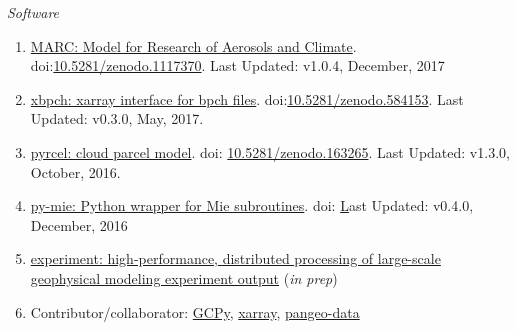 \documentclass[11pt,letterpaper]{article}
\newcommand{\mhead}[1]{\leavevmode\marginpar{\sffamily\footnotesize #1}}
\begin{document}
\bigskip
\emph{Software}
\medskip
\begin{enumerate}[itemindent=-10pt]

\item \href{https://github.mit.edu/marc/marc_cesm}{MARC: Model for Research of Aerosols and Climate}. doi:\href{https://doi.org/10.5281/zenodo.1117370}{10.5281/zenodo.1117370}. Last Updated: v1.0.4, December, 2017

\item \href{https://github.com/darothen/xbpch}{xbpch: xarray interface for bpch files}. doi:\href{https://doi.org/10.5281/zenodo.584153}{10.5281/zenodo.584153}. Last Updated: v0.3.0, May, 2017.

\item \href{https://github.com/darothen/pyrcel}{pyrcel: cloud parcel model}. doi: \href{https://doi.org/10.5281/zenodo.163265}{10.5281/zenodo.163265}. Last Updated: v1.3.0, October, 2016.

\item \href{https://github.com/darothen/py-mie}{py-mie: Python wrapper for Mie subroutines}. doi: \href{http://doi.org/10.5281/zenodo.192510} Last Updated: v0.4.0, December, 2016

\item \href{https://github.com/darothen/experiment}{experiment: high-performance, distributed processing of large-scale geophysical modeling experiment output} (\emph{in prep})

\item Contributor/collaborator: \href{https://bitbucket.org/gcst/gcpy/}{GCPy}, \href{https://github.com/pydata/xarray}{xarray}, \href{https://github.com/pangeo-data/pangeo}{pangeo-data}

\end{enumerate}


\bigskip
\mhead{Presentations \newline and \newline Talks}%
\end{document}
